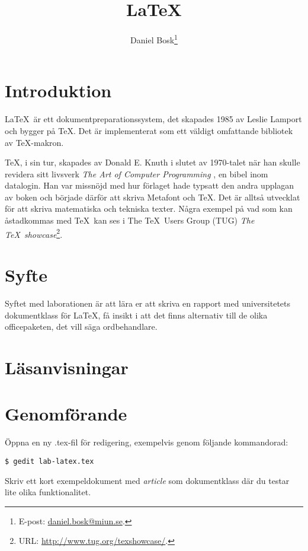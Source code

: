\documentclass[a4paper]{miunasgn}
\title{\LaTeX}
\author{Daniel Bosk\footnote{%
	E-post: \href{mailto:daniel.bosk@miun.se}{daniel.bosk@miun.se}.
}}
\date{\svnId}
\begin{document}
\maketitle
\thispagestyle{foot}
\tableofcontents


\section{Introduktion}
\label{sec:Introduktion}
\noindent
\LaTeX\ är ett dokumentpreparationssystem, det skapades 1985 av Leslie Lamport 
och bygger på \TeX.
Det är implementerat som ett väldigt omfattande bibliotek av \TeX-makron.

\TeX, i sin tur, skapades av Donald E. Knuth i slutet av 1970-talet när han 
skulle revidera sitt livsverk \emph{The Art of Computer Programming} 
\citep{TUG2011jwi}, en bibel inom datalogin.
Han var missnöjd med hur förlaget hade typsatt den andra upplagan av boken och 
började därför att skriva Metafont och \TeX.
Det är alltså utvecklat för att skriva matematiska och tekniska texter.
Några exempel på vad som kan åstadkommas med \TeX\ kan ses i The \TeX\ Users 
Group (TUG) \emph{The \TeX\ showcase}\footnote{%
	URL: \url{http://www.tug.org/texshowcase/}.
}.


\section{Syfte}
\label{sec:Syfte}
\noindent
Syftet med laborationen är att lära er att skriva en rapport med universitetets 
dokumentklass för \LaTeX, få insikt i att det finns alternativ till de olika 
officepaketen, det vill säga ordbehandlare.


\section{Läsanvisningar}
\label{sec:Lasanvisningar}
\noindent



\section{Genomförande}
\label{sec:Genomforande}
\noindent
Öppna en ny .tex-fil för redigering, exempelvis genom följande kommandorad:
\begin{lstlisting}
$ gedit lab-latex.tex
\end{lstlisting}
Skriv ett kort exempeldokument med \emph{article} som dokumentklass där du 
testar lite olika funktionalitet.
\end{document}

